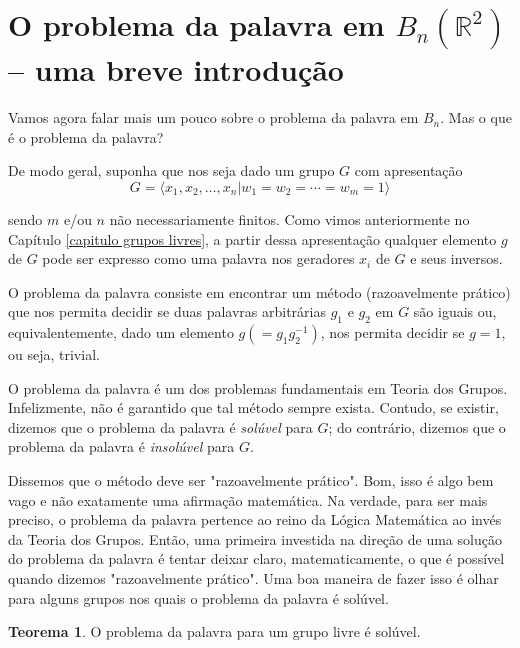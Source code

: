 \documentclass[a4paper,portuguese,11pt,twoside, leqno]{book}
\theoremstyle{definition}
\newtheorem{theorem}{Teorema}[section]
\begin{document}
	\section{O problema da palavra em $B_n(\mathbb{R}^2)$ -- uma breve introdução}\label{secao o problema da palavra}
	\hspace{12pt} Vamos agora falar mais um pouco sobre o problema da palavra em $B_n$. Mas o que é o problema da palavra? 
	\par\vspace{0.3cm} De modo geral, suponha que nos seja dado um grupo $G$ com apresentação
	\begin{equation*}
	G = \langle x_1, x_2, \dots, x_n| w_1=w_2=\cdots=w_m=1 \rangle
	\end{equation*}
	\par\vspace{0.3cm} sendo $m$ e/ou $n$ não necessariamente finitos. Como vimos anteriormente no Capítulo \ref{capitulo grupos livres}, a partir dessa apresentação qualquer elemento $g$ de $G$ pode ser expresso como uma palavra nos geradores $x_i$ de $G$ e seus inversos. 
	\par\vspace{0.3cm} O problema da palavra consiste em encontrar um método (razoavelmente prático) que nos permita decidir se duas palavras arbitrárias $g_1$ e $g_2$ em $G$ são iguais ou, equivalentemente, dado um elemento $g (=g_1g_2^{-1})$, nos permita decidir se $g=1$, ou seja, trivial.
	\par\vspace{0.3cm} O problema da palavra é um dos problemas fundamentais em Teoria dos Grupos. Infelizmente, não é garantido que tal método sempre exista. Contudo, se existir, dizemos que o problema da palavra é \textit{solúvel} para $G$; do contrário, dizemos que o problema da palavra é \textit{insolúvel} para $G$.  
	\par\vspace{0.3cm} Dissemos que o método deve ser "razoavelmente prático". Bom, isso é algo bem vago e não exatamente uma afirmação matemática. Na verdade, para ser mais preciso, o problema da palavra pertence ao reino da Lógica Matemática ao invés da Teoria dos Grupos. Então, uma primeira investida na direção de uma solução do problema da palavra é tentar deixar claro, matematicamente, o que é possível quando dizemos "razoavelmente prático". Uma boa maneira de fazer isso é olhar para alguns grupos nos quais o problema da palavra é solúvel.
	\begin{theorem}
		\label{problema da palavra soluvel para grupos livres}
		O problema da palavra para um grupo livre é solúvel.
	\end{theorem}
\end{document}
